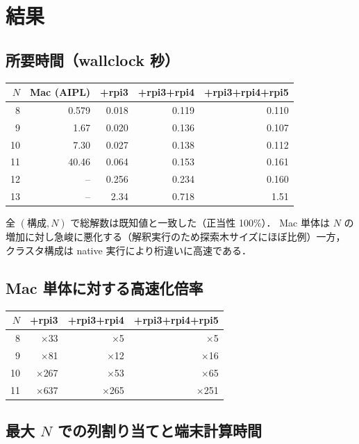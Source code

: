 \documentclass[11pt,a4paper]{article}
\begin{document}
\section{結果}

\subsection{所要時間（wall\textendash clock 秒）}

\begin{center}
\begin{tabular}{rrrrr}
\toprule
$N$ & Mac \scriptsize(AIPL) & +rpi3 & +rpi3+rpi4 & +rpi3+rpi4+rpi5 \\
\midrule
8 & 0.579 & 0.018 & 0.119 & 0.110 \\
9 & 1.67 & 0.020 & 0.136 & 0.107 \\
10 & 7.30 & 0.027 & 0.138 & 0.112 \\
11 & 40.46 & 0.064 & 0.153 & 0.161 \\
12 & -- & 0.256 & 0.234 & 0.160 \\
13 & -- & 2.34 & 0.718 & 1.51 \\
\bottomrule
\end{tabular}
\end{center}

全 $(構成,N)$ で総解数は既知値と一致した（正当性 100\%）．
Mac 単体は $N$ の増加に対し急峻に悪化する（解釈実行のため探索木サイズにほぼ比例）一方，
クラスタ構成は native 実行により桁違いに高速である．

\subsection{Mac 単体に対する高速化倍率}

\begin{center}
\begin{tabular}{rrrr}
\toprule
$N$ & +rpi3 & +rpi3+rpi4 & +rpi3+rpi4+rpi5 \\
\midrule
8 & $\times$33 & $\times$5 & $\times$5 \\
9 & $\times$81 & $\times$12 & $\times$16 \\
10 & $\times$267 & $\times$53 & $\times$65 \\
11 & $\times$637 & $\times$265 & $\times$251 \\
\bottomrule
\end{tabular}
\end{center}

\subsection{最大 $N$ での列割り当てと端末計算時間}
\end{document}
